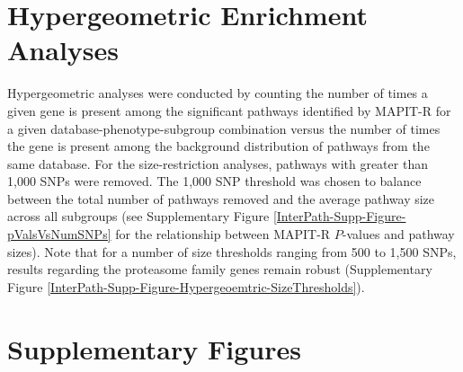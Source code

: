 \documentclass[10pt]{article}
\begin{document}
\section{Hypergeometric Enrichment Analyses}

Hypergeometric analyses were conducted by counting the number of times a given gene is present among the significant pathways identified by MAPIT-R for a given database-phenotype-subgroup combination versus the number of times the gene is present among the background distribution of pathways from the same database. For the size-restriction analyses, pathways with greater than 1,000 SNPs were removed. The 1,000 SNP threshold was chosen to balance between the total number of pathways removed and the average pathway size across all subgroups (see Supplementary Figure \ref{InterPath-Supp-Figure-pValsVsNumSNPs} for the relationship between MAPIT-R $P$-values and pathway sizes). Note that for a number of size thresholds ranging from 500 to 1,500 SNPs, results regarding the proteasome family genes remain robust (Supplementary Figure \ref{InterPath-Supp-Figure-Hypergeoemtric-SizeThresholds}).

\clearpage

\section{Supplementary Figures}\label{Supplementary-Figures}

\renewcommand{\figurename}{Supplementary Figure}
\renewcommand{\tablename}{Supplementary Table}
\setcounter{figure}{0}
\setcounter{table}{0}
\end{document}
